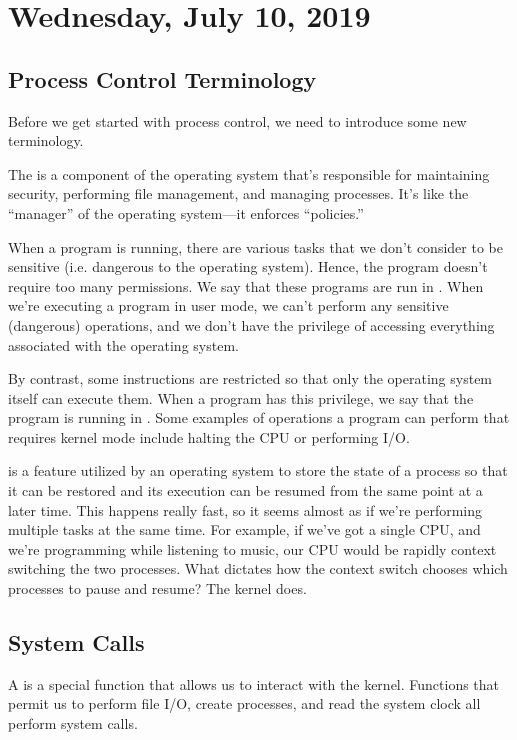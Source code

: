 \section{Wednesday, July 10, 2019}

\subsection{Process Control Terminology}

Before we get started with process control, we need to introduce some new terminology.

The  is a component of the operating system that's responsible for maintaining security, performing file management, and managing processes. It's like the ``manager'' of the operating system---it enforces ``policies.''


When a program is running, there are various tasks that we don't consider to be sensitive (i.e. dangerous to the operating system). Hence, the program doesn't require too many permissions. We say that these programs are run in . When we're executing a program in user mode, we can't perform any sensitive (dangerous) operations, and we don't have the privilege of accessing everything associated with the operating system. 


By contrast, some instructions are restricted so that only the operating system itself can execute them. When a program has this privilege, we say that the program is running in . Some examples of operations a program can perform that requires kernel mode include halting the CPU or performing I/O.


 is a feature utilized by an operating system to store the state of a process so that it can be restored and its execution can be resumed from the same point at a later time. This happens really fast, so it seems almost as if we're performing multiple tasks at the same time. For example, if we've got a single CPU, and we're programming while listening to music, our CPU would be rapidly context switching the two processes. What dictates how the context switch chooses which processes to pause and resume? The kernel does.

\subsection{System Calls}

A  is a special function that allows us to interact with the kernel. Functions that permit us to perform file I/O, create processes, and read the system clock all perform system calls.

